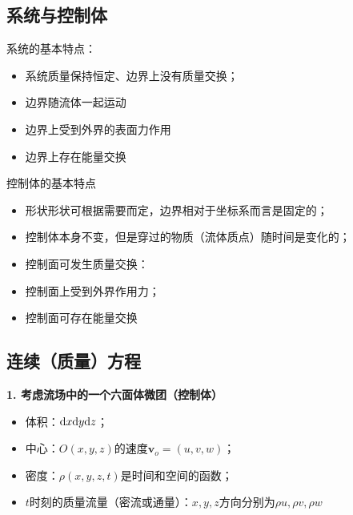 \subsection{系统与控制体}
\vspace*{-1em}

\noindent 系统的基本特点：
\begin{itemize}
	\item 系统质量保持恒定、边界上没有质量交换；\vspace*{-0.5em}
	\item 边界随流体一起运动\vspace*{-0.5em}
	\item 边界上受到外界的表面力作用\vspace*{-0.5em}
	\item 边界上存在能量交换
\end{itemize}


\noindent 控制体的基本特点
\begin{itemize}
	\item 形状形状可根据需要而定，边界相对于坐标系而言是固定的；\vspace*{-0.5em}
	\item 控制体本身不变，但是穿过的物质（流体质点）随时间是变化的；\vspace*{-0.5em}
	\item 控制面可发生质量交换：\vspace*{-0.5em}
	\item 控制面上受到外界作用力；\vspace*{-0.5em}
	\item 控制面可存在能量交换
\end{itemize}

\subsection{连续（质量）方程}
\noindent \textbf{1. 考虑流场中的一个六面体微团（控制体）}
\begin{itemize}
	\item 体积：${\rm{d}} x {\rm{d}} y {\rm{d}} z$；\vspace*{-0.5em}
	\item 中心：$O(x,y,z)$的速度$\bm{v}_o = (u,v,w)$；\vspace*{-0.5em}
	\item 密度：$\rho(x,y,z,t)$是时间和空间的函数；\vspace*{-0.5em}
	\item $t$时刻的质量流量（密流或通量）：$x,y,z$方向分别为$\rho u , \rho v , \rho w$
\end{itemize}
\vspace*{0.5em}

